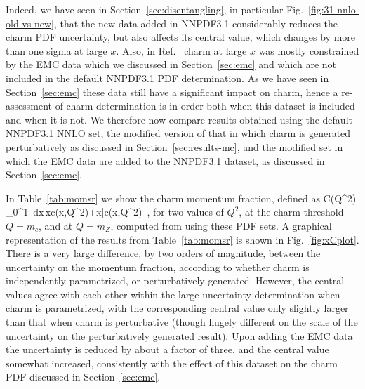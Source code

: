 Indeed, we have seen in
Section~\ref{sec:disentangling}, in particular
Fig.~\ref{fig:31-nnlo-old-vs-new}, that the new data added in
NNPDF3.1 considerably reduces the charm PDF uncertainty, but also affects its
central value, which changes by more than one sigma at large $x$.
Also, in Ref.~\cite{Ball:2016neh} charm at large $x$ was mostly
constrained by the EMC data which we discussed in Section~\ref{sec:emc}
and which are not included in the default NNPDF3.1 PDF
determination. As we have seen in Section~\ref{sec:emc} these data still
have a significant impact on charm, hence a re-assessment of charm
determination is in order both when this dataset is included and when it
is not. We therefore now compare results obtained using the
default NNPDF3.1 NNLO set, the modified version of that in which charm
is generated perturbatively as discussed in
Section~\ref{sec:results-mc}, and the modified set in which the EMC data are added
to the NNPDF3.1 dataset, as discussed in Section~\ref{sec:emc}.

In Table~\ref{tab:momsr} we show the charm momentum fraction, defined as
\be
\label{eq:charmmomfrac}
C(Q^2) \equiv \int_0^1\, dx\,\lp xc(x,Q^2)+x\bar{c}(x,Q^2)\rp \ ,
\ee
for two values of $Q^2$, at the charm threshold $Q=m_c$, and at
$Q=m_Z$, computed from using these PDF sets.
A graphical representation of the results from 
Table~\ref{tab:momsr} is shown in Fig.~\ref{fig:xCplot}.
There is a very large difference, by two orders of
magnitude, between the uncertainty on the momentum fraction, according
to whether charm is independently parametrized, or perturbatively generated.
However, the central values
agree with each other
within the large uncertainty determination when charm is parametrized, with
the corresponding central value only slightly larger than that when
charm is  perturbative
(though hugely different on the scale of the uncertainty on the
perturbatively generated result).
Upon adding the EMC data the
uncertainty is reduced by about a factor of three, and the central
value somewhat increased, consistently with the effect of this dataset on
the charm PDF discussed in Section~\ref{sec:emc}.

